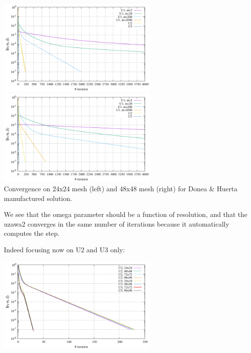 \begin{center}
\includegraphics[width=8cm]{python_codes/fieldstone_147/RESULTS/uzawa123/convergence_24x24.pdf}
\includegraphics[width=8cm]{python_codes/fieldstone_147/RESULTS/uzawa123/convergence_48x48.pdf}\\
{\captionfont Convergence on 24x24 mesh (left) and 48x48 mesh (right) 
for Donea \& Huerta manufactured solution.}
\end{center}

We see that the omega parameter should be a function of resolution, and that 
the uzawa2 converges in the same number of iterations because it automatically 
computes the step.

Indeed focusing now on U2 and U3 only:
\begin{center}
\includegraphics[width=8cm]{python_codes/fieldstone_147/RESULTS/uzawa123/convergence_uzawa23}
\end{center}







